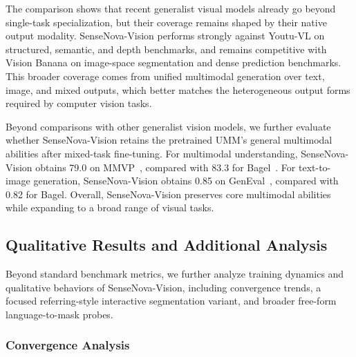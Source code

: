 \begin{table}[t]
    \caption{
        Quantitative comparison with recent generalist visual models under the metrics reported in their original papers.
        For Vision Banana, $^\dagger$ denotes a Gemini-assisted ReasonSeg result,
        and $^\ddagger$ marks depth scores reported under an absolute-depth protocol,
        whereas SenseNova-Vision uses affine-invariant depth evaluation;
        these entries are included only as reference comparisons.
    }
    \label{tab:generalist-visual-models}
\end{table}

The comparison shows that recent generalist visual models already go beyond single-task specialization, but their coverage remains shaped by their native output modality.
SenseNova-Vision performs strongly against Youtu-VL on structured, semantic, and depth benchmarks, and remains competitive with Vision Banana on image-space segmentation and dense prediction benchmarks.
This broader coverage comes from unified multimodal generation over text, image, and mixed outputs, which better matches the heterogeneous output forms required by computer vision tasks.

Beyond comparisons with other generalist vision models, we further evaluate whether SenseNova-Vision retains the pretrained UMM's general multimodal abilities after mixed-task fine-tuning.
For multimodal understanding, SenseNova-Vision obtains 79.0 on MMVP~\cite{mmvp}, compared with 83.3 for Bagel~\cite{bagel}.
For text-to-image generation, SenseNova-Vision obtains 0.85 on GenEval~\cite{geneval}, compared with 0.82 for Bagel.
Overall, SenseNova-Vision preserves core multimodal abilities while expanding to a broad range of visual tasks.

\subsection{Qualitative Results and Additional Analysis}
\label{sec:qualitative-behavioral-analysis}

Beyond standard benchmark metrics, we further analyze training dynamics and qualitative behaviors of SenseNova-Vision, including convergence trends, a focused referring-style interactive segmentation variant, and broader free-form language-to-mask probes.

\subsubsection{Convergence Analysis}
\label{sec:convergence-analysis}

